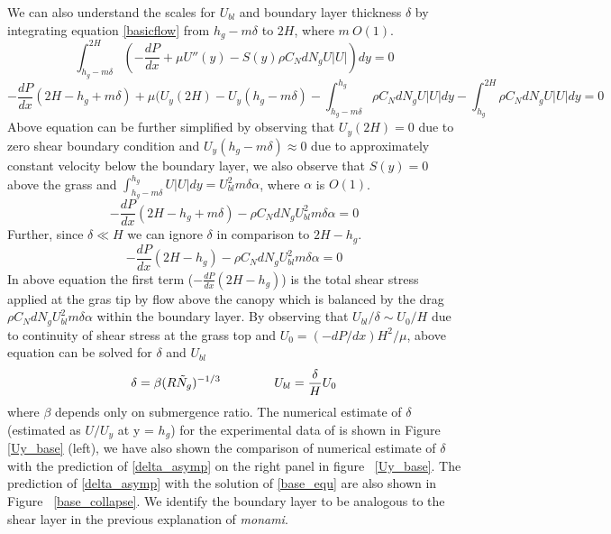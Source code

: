 \documentclass[12pt]{report}   %
\newcommand{\Ndg}{\tilde{N}_g}
\newcommand{\monami}{\textit{monami}}
\begin{document}
We can also understand the scales for $U_{bl}$ and boundary layer thickness $\delta$ by integrating equation \eqref{basicflow} from $h_g-m\delta$ to $2H$, where $m ~ O(1)$.
\begin{equation}
 \int_{h_g-m\delta}^{2H} \left( -\frac{dP}{dx}+\mu U''(y) -S(y) \rho C_N d N_gU |U|\right)dy = 0 
\end{equation}
\begin{equation*}
-\frac{dP}{dx}(2H-h_g+m\delta)+\mu (U_y(2H)-U_y(h_g-m\delta) -\int_{h_g-m\delta}^{h_g} \rho C_N d N_gU |U|dy -\int_{h_g}^{2H} \rho C_N d N_gU |U|dy =0
\end{equation*}
Above equation can be further simplified by observing that $U_y(2H)=0$ due to zero shear boundary condition and $U_y(h_g-m\delta) \approx 0$ due to approximately constant velocity below the boundary layer, we also observe that $S(y)=0$ above the grass and $\int_{h_g-m\delta}^{h_g} U |U| dy = U_{bl}^2 m\delta \alpha$, where $\alpha$ is $O(1)$.
\begin{equation*}
-\frac{dP}{dx}(2H-h_g+m\delta) - \rho C_N d N_g U_{bl}^2 m \delta \alpha  =0
\end{equation*}
Further, since $\delta \ll H$ we can ignore $\delta$ in comparison to $2H-h_g$.
\begin{equation}
-\frac{dP}{dx}(2H-h_g) - \rho C_N d N_g U_{bl}^2 m \delta \alpha  =0
\end{equation}
In above equation the first term ($ -\frac{dP}{dx}(2H-h_g)$) is the total shear stress applied at the gras tip by flow above the canopy which is balanced by the drag $\rho C_N d N_g U_{bl}^2 m \delta \alpha $ within the boundary layer. By observing that $ U_{bl}/\delta \sim U_0/H$ due to continuity of shear stress at the grass top and $U_0 = (-dP/dx) H^2/\mu$, above equation can be solved for $\delta$ and $U_{bl}$
\begin{equation}
 \delta = \beta (R\Ndg)^{-1/3} \hspace{1.5cm} U_{bl} = \frac{\delta}{H} U_0 
 \label{delta_asymp}
\end{equation}
where $\beta$ depends only on submergence ratio. The numerical estimate of $\delta$ (estimated as $U/U_y$ at y = $h_g$) for the experimental data of \cite{Nepf04} is shown in Figure \ref{Uy_base} (left), we have also shown the comparison of numerical estimate of $\delta$ with the prediction of \eqref{delta_asymp} on the right panel in figure ~\ref{Uy_base}.
The prediction of \eqref{delta_asymp} with the solution of \eqref{base_equ} are also shown in Figure ~\ref{base_collapse}. We identify the boundary layer to be analogous to the shear layer \cite{Ghisal02,Nepf04} in the previous explanation of \monami.
\end{document}
